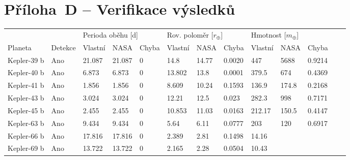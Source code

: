 \documentclass[a4paper,12pt]{article}
\begin{document}
{{{{{{{{{{{{{\section*{Příloha~D -- Verifikace výsledků}\label{priloha_d}
\begin{table}[!ht]
	\def\arraystretch{1.2}
	\setlength{\tabcolsep}{1pt}
	\begin{tabularx}{\textwidth}{|p{60pt}|X|X|X|X|X|X|X|X|X|X|X|X|}
		\hline
		\rowcolor{lightgray}
		\multicolumn{11}{|c|}{\textbf{Pozitivní}} \\
		\hline
		\rowcolor{lightgray}
		& & \multicolumn{3}{|l|}{Perioda oběhu [d]} & \multicolumn{3}{|l|}{Rov. poloměr [$r_\oplus$]} & \multicolumn{3}{|l|}{Hmotnost [$m_\oplus$]} \\	
		\hline	
		\rowcolor{lightgray}
		Planeta & Detekce & Vlastní & NASA & Chyba & Vlastní & NASA & Chyba & Vlastní & NASA & Chyba \\
		\hline	
		Kepler-39 b & \cellcolor{lightgreen} Ano & 21.087 & 21.087 & \cellcolor{lightgreen} 0 & 14.8 & 14.77 & \cellcolor{lightgreen} 0.0020 & 447 & 5688 & \cellcolor{lightred} 0.9214  \\	
		\hline	
		Kepler-40 b & \cellcolor{lightgreen} Ano & 6.873 & 6.873 & \cellcolor{lightgreen} 0 & 13.802 & 13.8 & \cellcolor{lightgreen} 0.0001 & 379.5 & 674 & \cellcolor{lightorange} 0.4369 \\	
		\hline	
		Kepler-41 b & \cellcolor{lightgreen} Ano & 1.856 & 1.856 & \cellcolor{lightgreen} 0 & 8.609 & 10.24 & \cellcolor{lightorange} 0.1593 & 136.9 & 174.8 & \cellcolor{lightorange} 0.2168 \\	
		\hline	
		Kepler-43 b & \cellcolor{lightgreen} Ano & 3.024 & 3.024 & \cellcolor{lightgreen} 0 & 12.21 & 12.5 & \cellcolor{lightgreen} 0.023 & 282.3 & 998 & \cellcolor{lightred} 0.7171 \\	
		\hline	
		Kepler-45 b & \cellcolor{lightgreen} Ano & 2.455 & 2.455 & \cellcolor{lightgreen} 0 & 10.853 & 11.03 & \cellcolor{lightgreen} 0.0163 & 212.17 & 150.5 & \cellcolor{lightorange} 0.4147 \\	
		\hline	
		Kepler-63 b & \cellcolor{lightgreen} Ano & 9.434 & 9.434 & \cellcolor{lightgreen} 0 & 5.64 & 6.11 & \cellcolor{lightgreen} 0.0777 & 203 & 120 & \cellcolor{lightred} 0.6917 \\	
		\hline	
		Kepler-66 b & \cellcolor{lightgreen} Ano & 17.816 & 17.816 & \cellcolor{lightgreen} 0 & 2.389 & 2.81 & \cellcolor{lightorange} 0.1498 & 14.16 & & \\
		\hline	
		Kepler-69 b & \cellcolor{lightgreen} Ano & 13.722 & 13.722 & \cellcolor{lightgreen} 0 & 2.165 & 2.28 & \cellcolor{lightgreen} 0.0504 & 10.43 &  & \\		

\end{tabularx}
\end{table}}}}}}}}}}}}}}
\end{document}
